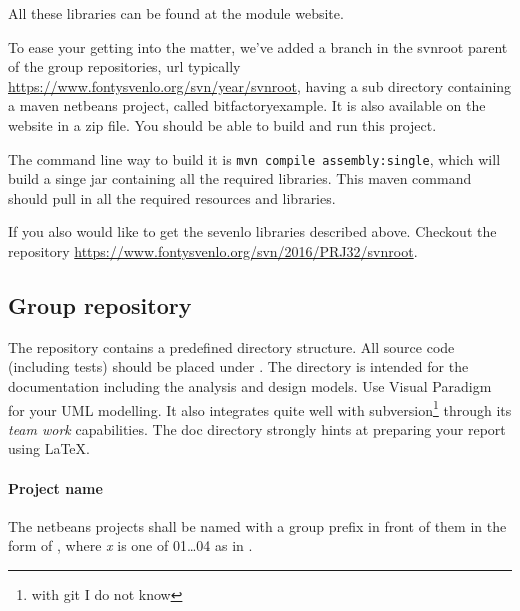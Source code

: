 All these libraries can be found at the module website.

To ease your getting into the matter, we've added a branch in the
svnroot parent of the group repositories, url typically
\url{https://www.fontysvenlo.org/svn/year/svnroot}, 
having a sub directory containing a maven netbeans project, called
bitfactoryexample. 
It is also available on the website in a zip file. You should be able to
  build and run this project. 

The command line way to build it is
\texttt{mvn compile assembly:single}, which will build a singe jar
containing all the required libraries. This maven command should pull
in all the required resources and libraries.

If you also would like to get the sevenlo libraries described
above. Checkout the repository \url{https://www.fontysvenlo.org/svn/2016/PRJ32/svnroot}.



\subsection{Group repository}
The
repository contains a predefined directory structure. All source 
code (including tests) should be placed under . The 
directory is intended for the documentation including the analysis and
design models. Use Visual Paradigm for your UML modelling. It also
integrates quite well with subversion\footnote{with git I do not know} through its \textit{team work}
capabilities. The doc directory strongly hints at preparing your
report using \LaTeX.

\paragraph{Project name} The netbeans projects shall be named with a
group prefix in front of them in the form of , where \textit{x} is
one of 01\ldots04  as in .

